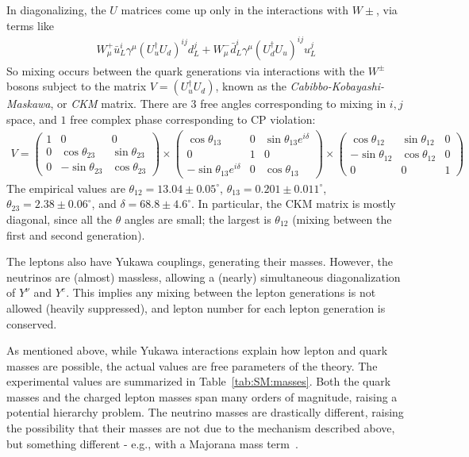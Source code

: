 In diagonalizing, the $U$ matrices come up only in the interactions with $W\pm$, via terms like
\begin{align}
  W^+_\mu\bar{u}_L^i\gamma^\mu\left(U_u^\dagger U_d\right)^{ij} d_L^j + W^-_\mu\bar{d}_L^i\gamma^\mu\left(U_d^\dagger U_u\right)^{ij} u_L^j
\end{align}
So mixing occurs between the quark generations via interactions with the $W^\pm$ bosons subject to the matrix $V=\left(U_u^\dagger U_d\right)$, known as the \textit{Cabibbo-Kobayashi-Maskawa}, or \textit{CKM} matrix.
There are $3$ free angles corresponding to mixing in $i,j$ space, and $1$ free complex phase corresponding to CP violation:
\begin{align}
V = \begin{pmatrix} 1 & 0 & 0 \\ 0 & \cos\theta_{23} & \sin\theta_{23} \\ 0 & -\sin\theta_{23} & \cos\theta_{23} \end{pmatrix}\times
\begin{pmatrix} \cos\theta_{13} & 0 & \sin\theta_{13}e^{i\delta} \\ 0 & 1 & 0 \\-\sin\theta_{13}e^{i\delta} & 0 & \cos\theta_{13} \end{pmatrix}\times
\begin{pmatrix} \cos\theta_{12} & \sin\theta_{12} & 0 \\ -\sin\theta_{12} & \cos\theta_{12} & 0 \\ 0 & 0 & 1 \end{pmatrix}
\end{align}
The empirical values are $\theta_{12}=13.04\pm0.05^\circ$, $\theta_{13}=0.201\pm0.011^\circ$, $\theta_{23}=2.38\pm0.06^\circ$, and $\delta=68.8\pm4.6^\circ$.
In particular, the CKM matrix is mostly diagonal, since all the $\theta$ angles are small; the largest is $\theta_{12}$ (mixing between the first and second generation).

The leptons also have Yukawa couplings, generating their masses.
However, the neutrinos are (almost) massless, allowing a (nearly) simultaneous diagonalization of $Y^\nu$ and $Y^e$.
This implies any mixing between the lepton generations is not allowed (heavily suppressed), and lepton number for each lepton generation is conserved.

As mentioned above, while Yukawa interactions explain how lepton and quark masses are possible, the actual values are free parameters of the theory.
The experimental values are summarized in Table~\ref{tab:SM:masses}.
Both the quark masses and the charged lepton masses span many orders of magnitude, raising a potential hierarchy problem.
The neutrino masses are drastically different, raising the possibility that their masses are not due to the mechanism described above, but something different - e.g., with a Majorana mass term~\cite{ref:TODO}.

